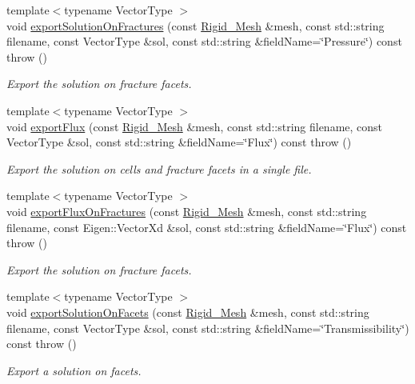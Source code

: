 \begin{DoxyCompactItemize}
{\footnotesize template$<$typename Vector\+Type $>$ }\\void \hyperlink{classFVCode3D_1_1Exporter_a64dba2dc601941c720cf1b7f73a6ff3b}{export\+Solution\+On\+Fractures} (const \hyperlink{classFVCode3D_1_1Rigid__Mesh}{Rigid\+\_\+\+Mesh} \&mesh, const std\+::string filename, const Vector\+Type \&sol, const std\+::string \&field\+Name=\char`\"{}Pressure\char`\"{}) const   throw ()
\begin{DoxyCompactList}\small\item\em Export the solution on fracture facets. \end{DoxyCompactList}\item 
{\footnotesize template$<$typename Vector\+Type $>$ }\\void \hyperlink{classFVCode3D_1_1Exporter_a8535245a89df8fca2fe6fbd8fab11265}{export\+Flux} (const \hyperlink{classFVCode3D_1_1Rigid__Mesh}{Rigid\+\_\+\+Mesh} \&mesh, const std\+::string filename, const Vector\+Type \&sol, const std\+::string \&field\+Name=\char`\"{}Flux\char`\"{}) const   throw ()
\begin{DoxyCompactList}\small\item\em Export the solution on cells and fracture facets in a single file. \end{DoxyCompactList}\item 
{\footnotesize template$<$typename Vector\+Type $>$ }\\void \hyperlink{classFVCode3D_1_1Exporter_a3011faad5f0b873cf7502d0141cef625}{export\+Flux\+On\+Fractures} (const \hyperlink{classFVCode3D_1_1Rigid__Mesh}{Rigid\+\_\+\+Mesh} \&mesh, const std\+::string filename, const Eigen\+::\+Vector\+Xd \&sol, const std\+::string \&field\+Name=\char`\"{}Flux\char`\"{}) const   throw ()
\begin{DoxyCompactList}\small\item\em Export the solution on fracture facets. \end{DoxyCompactList}\item 
{\footnotesize template$<$typename Vector\+Type $>$ }\\void \hyperlink{classFVCode3D_1_1Exporter_ad63ad608ca43fdc5da73ee26c0ce9004}{export\+Solution\+On\+Facets} (const \hyperlink{classFVCode3D_1_1Rigid__Mesh}{Rigid\+\_\+\+Mesh} \&mesh, const std\+::string filename, const Vector\+Type \&sol, const std\+::string \&field\+Name=\char`\"{}Transmissibility\char`\"{}) const   throw ()
\begin{DoxyCompactList}\small\item\em Export a solution on facets. \end{DoxyCompactList}\item 

\end{DoxyCompactItemize}
